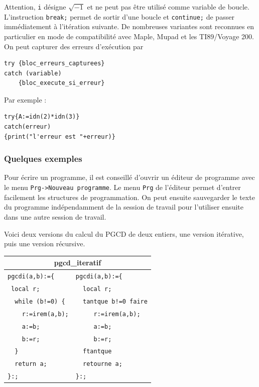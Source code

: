 \documentclass{article}
\begin{document}
\begin{giacjshere}
Attention, \verb|i| d\'esigne $\sqrt{-1}$ et ne peut pas \^etre
utilis\'e comme variable de boucle.
L'instruction \verb|break;| permet de sortir d'une boucle
et \verb|continue;| de passer imm\'ediatement \`a l'it\'eration
suivante.
De nombreuses variantes sont reconnues en particulier en mode 
de compatibilit\'e avec Maple, Mupad et les TI89/Voyage 200.
On peut capturer des erreurs d'ex\'ecution par
\begin{verbatim}
try {bloc_erreurs_capturees} 
catch (variable)
    {bloc_execute_si_erreur}
\end{verbatim}
Par exemple :
\begin{verbatim}
try{A:=idn(2)*idn(3)} 
catch(erreur) 
{print("l'erreur est "+erreur)}
\end{verbatim}
%
\subsubsection{Quelques exemples}
%
Pour \'ecrire un programme, il est conseill\'e d'ouvrir
un \'editeur de programme avec le menu \verb|Prg->Nouveau programme|. Le menu
\verb|Prg| de l'\'editeur permet d'entrer facilement les structures
de programmation. On peut ensuite sauvegarder le texte du programme
ind\'ependamment de la session de travail pour l'utiliser ensuite
dans une autre session de travail.


Voici deux versions du calcul du PGCD de deux entiers, une
version it\'erative, puis une version r\'ecursive.

\begin{center}
\begin{tabular}{|l|l|}
\hline
\multicolumn{2}{|c|}{\bf pgcd\_iteratif}\\
\hline\hline
\verb+pgcdi(a,b):={+ &\verb+pgcdi(a,b):={+\\
\verb+ local r;+&\verb+  local r;+\\
\verb+  while (b!=0) {+&\verb+  tantque b!=0 faire+\\
\verb+    r:=irem(a,b);+&\verb+     r:=irem(a,b);+\\
\verb+    a:=b;+&\verb+     a:=b;+\\
\verb+    b:=r;+&\verb+     b:=r;+\\
\verb+  }+&\verb+  ftantque+\\
\verb+  return a;+&\verb+  retourne a;+\\
\verb+}:;+&\verb+}:;+\\
 \hline
\end{tabular}
\end{center}


\end{giacjshere}
\end{document}
